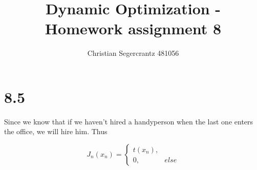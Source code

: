 \documentclass{article}
\title{Dynamic Optimization - Homework assignment 8}
\author{Christian Segercrantz 481056}
\begin{document}
	\maketitle
	\pagebreak

\section*{8.5}

Since we know that if we haven't hired a handyperson when the last one enters the office, we will hire him. Thus

\begin{equation}
	J_n(x_n) = 
	\begin{cases}
		t(x_n), & \\ 
		0, &else
	\end{cases}
\end{equation}
\end{document}
